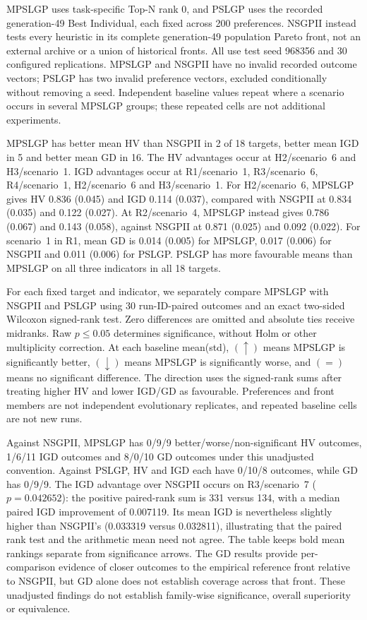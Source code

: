 MPSLGP uses task-specific Top-N rank 0, and PSLGP uses the recorded generation-49 Best Individual, each fixed across 200 preferences. NSGPII instead tests every heuristic in its complete generation-49 population Pareto front, not an external archive or a union of historical fronts. All use test seed 968356 and 30 configured replications. MPSLGP and NSGPII have no invalid recorded outcome vectors; PSLGP has two invalid preference vectors, excluded conditionally without removing a seed. Independent baseline values repeat where a scenario occurs in several MPSLGP groups; these repeated cells are not additional experiments.

MPSLGP has better mean HV than NSGPII in 2 of 18 targets, better mean IGD in 5 and better mean GD in 16. The HV advantages occur at H2/scenario~6 and H3/scenario~1. IGD advantages occur at R1/scenario~1, R3/scenario~6, R4/scenario~1, H2/scenario~6 and H3/scenario~1. For H2/scenario~6, MPSLGP gives HV 0.836 (0.045) and IGD 0.114 (0.037), compared with NSGPII at 0.834 (0.035) and 0.122 (0.027). At R2/scenario~4, MPSLGP instead gives 0.786 (0.067) and 0.143 (0.058), against NSGPII at 0.871 (0.025) and 0.092 (0.022). For scenario~1 in R1, mean GD is 0.014 (0.005) for MPSLGP, 0.017 (0.006) for NSGPII and 0.011 (0.006) for PSLGP. PSLGP has more favourable means than MPSLGP on all three indicators in all 18 targets.

For each fixed target and indicator, we separately compare MPSLGP with NSGPII and PSLGP using 30 run-ID-paired outcomes and an exact two-sided Wilcoxon signed-rank test. Zero differences are omitted and absolute ties receive midranks. Raw $p\leq0.05$ determines significance, without Holm or other multiplicity correction. At each baseline mean(std), $(\uparrow)$ means MPSLGP is significantly better, $(\downarrow)$ means MPSLGP is significantly worse, and $(=)$ means no significant difference. The direction uses the signed-rank sums after treating higher HV and lower IGD/GD as favourable. Preferences and front members are not independent evolutionary replicates, and repeated baseline cells are not new runs.

Against NSGPII, MPSLGP has 0/9/9 better/worse/non-significant HV outcomes, 1/6/11 IGD outcomes and 8/0/10 GD outcomes under this unadjusted convention. Against PSLGP, HV and IGD each have 0/10/8 outcomes, while GD has 0/9/9. The IGD advantage over NSGPII occurs on R3/scenario~7 ($p=0.042652$): the positive paired-rank sum is 331 versus 134, with a median paired IGD improvement of 0.007119. Its mean IGD is nevertheless slightly higher than NSGPII's (0.033319 versus 0.032811), illustrating that the paired rank test and the arithmetic mean need not agree. The table keeps bold mean rankings separate from significance arrows. The GD results provide per-comparison evidence of closer outcomes to the empirical reference front relative to NSGPII, but GD alone does not establish coverage across that front. These unadjusted findings do not establish family-wise significance, overall superiority or equivalence.

